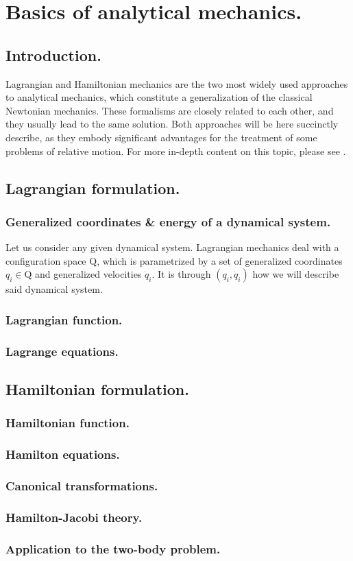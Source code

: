 \chapter{Basics of analytical mechanics.}
%
\label{app: 	Analytical_mechanics}
%
\section{Introduction.}
%
\indent Lagrangian and Hamiltonian mechanics are the two most widely used approaches to analytical mechanics, which constitute a generalization of the classical Newtonian mechanics. These formalisms are closely related to each other, and they usually lead to the same solution. Both approaches will be here succinctly describe, as they embody significant advantages for the treatment of some problems of relative motion. For more in-depth content on this topic, please see \cite{Wiesel, SCFormationFlying}.
%
\section{Lagrangian formulation.}
%
%
	\subsection{Generalized coordinates \& energy of a dynamical system.}
	\indent Let us consider any given dynamical system. Lagrangian mechanics deal with a configuration space $\mathrm{Q}$, which is parametrized by a set of generalized coordinates $q_i\in \mathrm{Q}$ and generalized velocities $\dot{q}_i$. It is through $(q_i, \dot{q}_i)$ how we will describe said dynamical system.
	\subsection{Lagrangian function.}
	\subsection{Lagrange equations.}
\section{Hamiltonian formulation.}
%
%
	\subsection{Hamiltonian function.}
	\subsection{Hamilton equations.}
	\subsection{Canonical transformations.}
	\subsection{Hamilton-Jacobi theory.}
	\subsection{Application to the two-body problem.}
